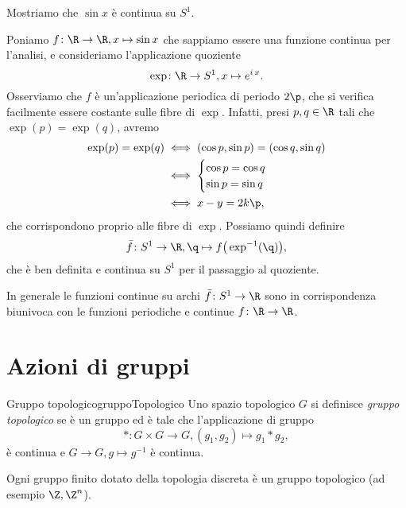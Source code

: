 \begin{ese}
	Mostriamo che \(\sin x\) è continua su \(S^1\).

	Poniamo \(f\colon \R \to \R, x \mapsto \sin x\) che sappiamo essere una funzione continua per l'analisi, e consideriamo l'applicazione quoziente
	\[
		\exp\colon \R \to S^1, x \mapsto e^{i\,x}.
	\]
	Osserviamo che \(f\) è un'applicazione periodica di periodo \(2\p\), che si verifica facilmente essere costante sulle fibre di \(\exp\).
	Infatti, presi \(p,q\in\R\) tali che \(\exp(p)=\exp(q)\), avremo
	\[
		\begin{split}
			\exp(p)=\exp(q) & \iff (\cos p,\sin p) = (\cos q, \sin q)\\
			& \iff 	\begin{cases}
				\cos p = \cos q \\
				\sin p = \sin q
			\end{cases}\\
			& \iff x-y = 2k\p,
		\end{split}
	\]
	che corrispondono proprio alle fibre di \(\exp\).
	Possiamo quindi definire
	\[
		\bar{f} \colon S^1 \to \R, \q \mapsto f\big(\exp^{-1}(\q)\big),
	\]
	che è ben definita e continua su \(S^1\) per il passaggio al quoziente.
\end{ese}

\begin{oss}
	In generale le funzioni continue su archi \(\bar{f}\colon S^1 \to \R\) sono in corrispondenza biunivoca con le funzioni periodiche e continue \(f\colon \R \to \R\).
\end{oss}
%
%
\section{Azioni di gruppi}

\begin{defn}{Gruppo topologico}{gruppoTopologico}
	Uno spazio topologico \(G\) si definisce \emph{gruppo topologico} se è un gruppo ed è tale che l'applicazione di gruppo
	\[
		*\colon G\times G \to G, (g_1,g_2) \mapsto g_1*g_2,
	\]
	è continua e \(G\to G,g \mapsto g^{-1}\) è continua.
\end{defn}

\begin{ese}
	Ogni gruppo finito dotato della topologia discreta è un gruppo topologico (ad esempio \(\Z,\Z^n\)).
\end{ese}

